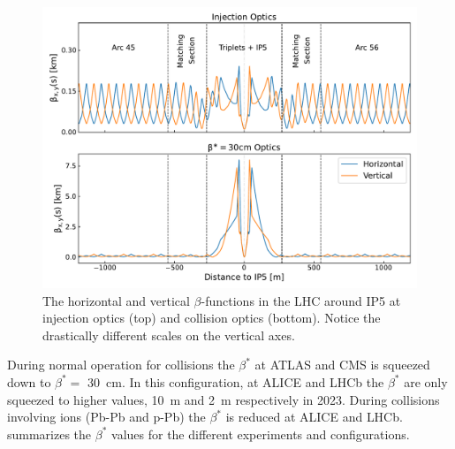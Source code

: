 \begin{figure}[!hbt]
  \centering
  \includegraphics*[width=0.99\linewidth]{Figures/Optics_Measurements_Corrections_at_LHC/ir5_surroundings_optics_2.pdf}
  \caption{The horizontal and vertical \(\beta\)-functions in the LHC around IP5 at injection optics (top) and collision optics (bottom). Notice the drastically different scales on the vertical axes.}
  \label{figure:ir5_and_around}
\end{figure}

During normal operation for collisions the \(\beta^{\ast}\) at \acrshort{ATLAS} and \acrshort{CMS} is squeezed down to \(\beta^{\ast} =\) \qty{30}{\centi\metre}.
In this configuration, at \acrshort{ALICE} and \acrshort{LHCb} the \(\beta^{\ast}\) are only squeezed to higher values, \qty{10}{\meter} and \qty{2}{\meter} respectively in \num{2023}.
During collisions involving ions (Pb-Pb and p-Pb) the \(\beta^{\ast}\) is reduced at \acrshort{ALICE} and \acrshort{LHCb}.
 summarizes the \(\beta^{\ast}\) values for the different experiments and configurations.

